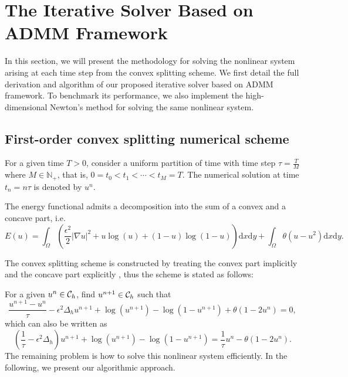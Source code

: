 \section{The Iterative Solver Based on ADMM Framework}
\label{section:admm}
In this section, we will present the methodology for solving the nonlinear system arising at each time step from the convex splitting scheme. 
We first detail the full derivation and algorithm of our proposed iterative solver based on ADMM framework. 
To benchmark its performance, we also implement the high-dimensional Newton's method for solving the same nonlinear system.

\subsection{First-order convex splitting numerical scheme}
For a given time $T>0$, consider a uniform partition of time with time step $\tau=\frac{T}{M}$ where $M\in \mathbb{N}_+$, that is, $0=t_0<t_1<\cdots<t_M=T$. 
The numerical solution at time $t_n=n\tau$ is denoted by $u^n$. 
\par The energy functional admits a decomposition into the sum of a convex and a concave part, i.e.
\begin{equation}
    E(u)=\int_{\Omega}(\frac{\epsilon^2}{2}|\nabla u|^2+u\log(u)+(1-u)\log(1-u))\text{d}x\text{d}y
    +\int_{\Omega}\theta (u-u^2)\text{d}x\text{d}y.
\end{equation}
\par The convex splitting scheme is constructed by treating the convex part implicitly and the concave part explicitly \cite{eyre1998unconditionally}, thus the scheme is stated as follows: 
\par For a given $u^n\in {\mathcal{C}_h}$, find $u^{n+1}\in {\mathcal{C}_h}$ such that
\begin{equation}
\label{scheme:cs}
    \frac{u^{n+1}-u^n}{\tau}-\epsilon^2\Delta_hu^{n+1}
    +\log(u^{n+1})-\log(1-u^{n+1})+\theta(1-2u^n)=0,
\end{equation}
which can also be written as\begin{equation}
\label{eq:cs}
    (\frac{1}{\tau}-\epsilon^2\Delta_h)u^{n+1}+\log(u^{n+1})-\log(1-u^{n+1})=\frac{1}{\tau}u^{n}-\theta(1-2u^n).
\end{equation}
The remaining problem is how to solve this nonlinear system efficiently. In the following, we present our algorithmic approach.
